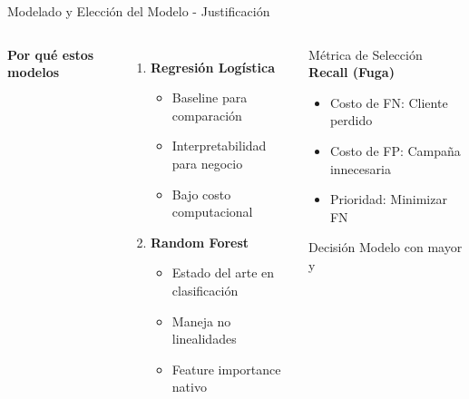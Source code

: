 \begin{frame}{Modelado y Elección del Modelo - Justificación}
    \begin{columns}[t]
        \textbf{Por qué estos modelos}
        \begin{enumerate}
            \item \textbf{Regresión Logística}
            \begin{itemize}
                \item Baseline para comparación
                \item Interpretabilidad para negocio
                \item Bajo costo computacional
            \end{itemize}
            \item \textbf{Random Forest}
            \begin{itemize}
                \item Estado del arte en clasificación
                \item Maneja no linealidades
                \item Feature importance nativo
            \end{itemize}
        \end{enumerate}
        
        \begin{block}{Métrica de Selección}
            \centering
            \textbf{Recall (Fuga)}
            \begin{itemize}
                \item Costo de FN: Cliente perdido
                \item Costo de FP: Campaña innecesaria
                \item Prioridad: Minimizar FN
            \end{itemize}
            
            \vsp
            \begin{alertblock}{Decisión}
                Modelo con mayor  y 
            \end{alertblock}
        \end{block}
    \end{columns}
\end{frame}